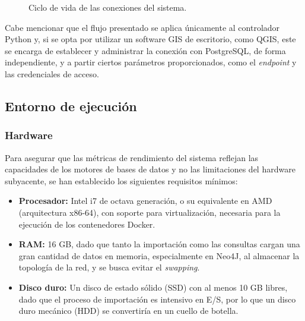 \begin{figure}[ht]
    \caption{Ciclo de vida de las conexiones del sistema.}
    \label{design:connections}
\end{figure}

Cabe mencionar que el flujo presentado se aplica únicamente al controlador Python y, si se opta por utilizar un software GIS de escritorio, como QGIS, este se encarga de establecer y administrar la conexión con PostgreSQL, de forma independiente, y a partir ciertos parámetros proporcionados, como el \textit{endpoint} y las credenciales de acceso.

\subsection{Entorno de ejecución}

\subsubsection{Hardware}

Para asegurar que las métricas de rendimiento del sistema reflejan las capacidades de los motores de bases de datos y no las limitaciones del hardware subyacente, se han establecido los siguientes requisitos mínimos:

\begin{itemize}
    \item \textbf{Procesador:} Intel i7 de octava generación, o su equivalente en AMD (arquitectura x86-64), con soporte para virtualización, necesaria para la ejecución de los contenedores Docker.
    \item \textbf{RAM:} 16 GB, dado que tanto la importación como las consultas cargan una gran cantidad de datos en memoria, especialmente en Neo4J, al almacenar la topología de la red, y se busca evitar el \textit{swapping}.
    \item \textbf{Disco duro:} Un disco de estado sólido (SSD) con al menos 10 GB libres, dado que el proceso de importación es intensivo en E/S, por lo que un disco duro mecánico (HDD) se convertiría en un cuello de botella.
\end{itemize}

